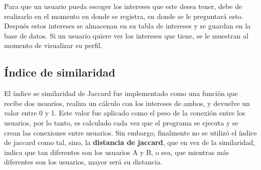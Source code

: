 \documentclass[9pt,letterpaper,onecolumn]{rho-class/rho}
\begin{document}
\vspace{0.5cm}
Para que un usuario pueda escoger los intereses que este desea tener, debe de realizarlo en el momento en donde se registra, en donde se le preguntará esto. Después estos intereses se almacenan en su tabla de intereses y se guardan en la base de datos. Si un usuario quiere ver los intereses que tiene, se le muestran al momento de visualizar su perfil.


\subsection{Índice de similaridad}
El índice se similaridad de Jaccard fue implementado como una función que recibe dos usuarios, realiza un cálculo con los intereses de ambos, y devuelve un valor entre 0 y 1. Este valor fue aplicado como el peso de la conexión entre los usuarios, por lo tanto, es calculado cada vez que el programa se ejecuta y se crean las conexiones entre usuarios. Sin embargo, finalmente no se utilizó el índice de jaccard como tal, sino, la \textbf{distancia de jaccard}, que en vez de la similaridad, indica que tan diferentes son los usuarios A y B, o sea, que mientras más diferentes son los usuarios, mayor será su distancia.
\end{document}
